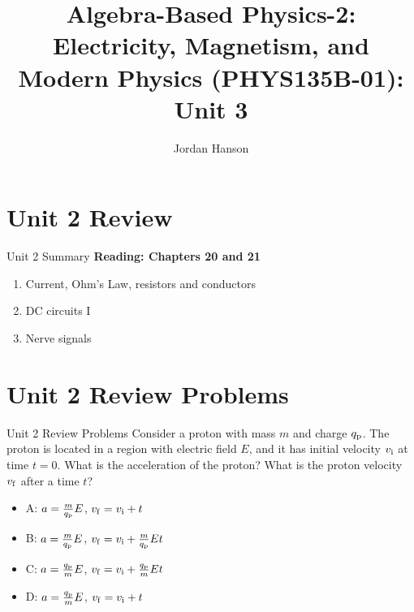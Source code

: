 \documentclass{beamer}
\title{Algebra-Based Physics-2: Electricity, Magnetism, and Modern Physics (PHYS135B-01): Unit 3}
\author{Jordan Hanson}
\institute{Whittier College Department of Physics and Astronomy}
\begin{document}
\maketitle

\section{Unit 2 Review}

\begin{frame}{Unit 2 Summary}
\textbf{Reading: Chapters 20 and 21}
\begin{enumerate}
\item Current, Ohm's Law, resistors and conductors
\item DC circuits I
\item Nerve signals
\end{enumerate}
\end{frame}

\section{Unit 2 Review Problems}

\begin{frame}{Unit 2 Review Problems}
Consider a proton with mass $m$ and charge $q_{\rm p}$.  The proton is located in a region with electric field $E$, and it has initial velocity $v_{\rm i}$ at time $t = 0$.  What is the acceleration of the proton?  What is the proton velocity $v_{\rm f}$ after a time $t$?
\begin{itemize}
\item A: $a = \frac{m}{q_{\rm p}} E$, $v_{\rm f}=v_{\rm i}+t$
\item B: $a = \frac{m}{q_{\rm p}} E$, $v_{\rm f}=v_{\rm i}+\frac{m}{q_{\rm p}} E t$
\item C: $a = \frac{q_{\rm p}}{m} E$, $v_{\rm f}=v_{\rm i}+\frac{q_{\rm p}}{m} E t$
\item D: $a = \frac{q_{\rm p}}{m} E$, $v_{\rm f}=v_{\rm i}+t$
\end{itemize}
\end{frame}

\end{document}
